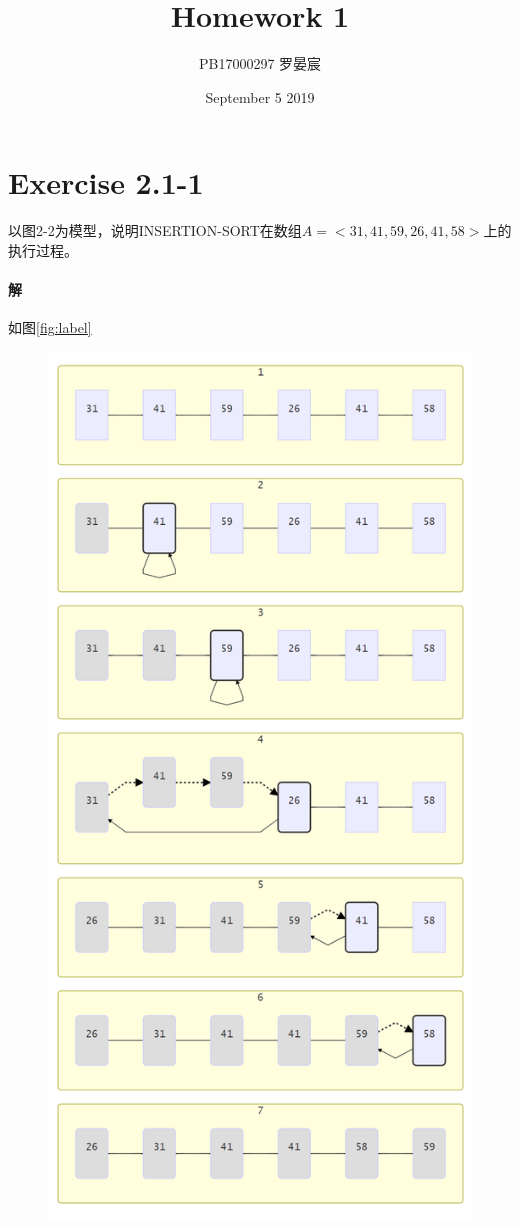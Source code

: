 \documentclass{article}
\title{Homework 1}
\author{PB17000297 罗晏宸}
\date{September 5 2019}
\begin{document}
\maketitle

\section{Exercise 2.1-1}
以图2-2为模型，说明\textsc{INSERTION-SORT}在数组$A=<31,41,59,26,41,58>$上的执行过程。\\
\par
\paragraph{解} 如图\ref{fig:label}

\begin{figure}
\centering
\includegraphics[scale=0.6]{Insertion-sort.png}

\end{figure}
\end{document}
